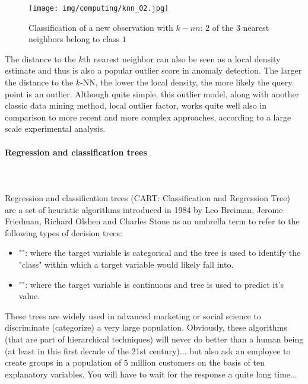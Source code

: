 	\begin{figure}[H]
		\centering
		\texttt{[image: img/computing/knn\_02.jpg]}
		\caption[]{Classification of a new observation with $k-nn$: $2$ of the $3$ nearest neighbors belong to class $1$}
	\end{figure}
	The distance to the $k$th nearest neighbor can also be seen as a local density estimate and thus is also a popular outlier score in anomaly detection. The larger the distance to the $k$-NN, the lower the local density, the more likely the query point is an outlier. Although quite simple, this outlier model, along with another classic data mining method, local outlier factor, works quite well also in comparison to more recent and more complex approaches, according to a large scale experimental analysis.
	
	\paragraph{Regression and classification trees}\mbox{}\\\\
	Regression and classification trees (CART: Classification and Regression Tree) are a set of heuristic algorithms  introduced in 1984 by Leo Breiman, Jerome Friedman, Richard Olshen and Charles Stone as an umbrella term to refer to the following types of decision trees: 
	\begin{itemize}
		\item "": where the target variable is categorical and the tree is used to identify the "class" within which a target variable would likely fall into.

		\item "": where the target variable is continuous and tree is used to predict it's value.
	\end{itemize}
	These trees are widely used in advanced marketing or social science to discriminate (categorize) a very large population. Obviously, these algorithms (that are part of hierarchical techniques) will never do better than a human being (at least in this first decade of the 21st century)... but also ask an employee to create groups in a population of $5$ million customers on the basis of ten explanatory variables. You will have to wait for the response a quite long time...
	
